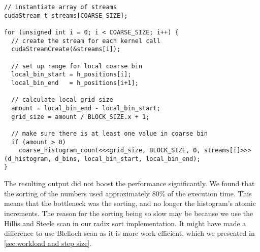 \begin{lstlisting}[caption={Using streams to invoke kernels concurrently}, label={lst:coarse histo streams}]
// instantiate array of streams
cudaStream_t streams[COARSE_SIZE];

for (unsigned int i = 0; i < COARSE_SIZE; i++) {
  // create the stream for each kernel call
  cudaStreamCreate(&streams[i]);

  // set up range for local coarse bin
  local_bin_start = h_positions[i];
  local_bin_end   = h_positions[i+1];

  // calculate local grid size
  amount = local_bin_end - local_bin_start;
  grid_size = amount / BLOCK_SIZE.x + 1;

  // make sure there is at least one value in coarse bin
  if (amount > 0)
    coarse_histogram_count<<<grid_size, BLOCK_SIZE, 0, streams[i]>>>(d_histogram, d_bins, local_bin_start, local_bin_end);
}
\end{lstlisting}


The resulting output did not boost the performance significantly.
We found that the sorting of the numbers used approximately $80\%$ of the execution time.
This means that the bottleneck was the sorting, and no longer the histogram's atomic increments.
The reason for the sorting being so slow may be because we use the Hillis and Steele scan in our radix sort implementation.
It might have made a difference to use Blelloch scan as it is more work efficient, which we presented in \cref{sec:workload and step size}.
